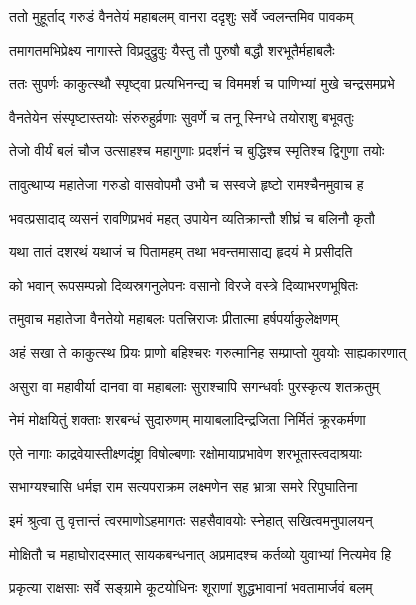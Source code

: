 \twolineshloka
{ततो मुहूर्ताद् गरुडं वैनतेयं महाबलम्}
{वानरा ददृशुः सर्वे ज्वलन्तमिव पावकम्} %

\twolineshloka
{तमागतमभिप्रेक्ष्य नागास्ते विप्रदुद्रुवुः}
{यैस्तु तौ पुरुषौ बद्धौ शरभूतैर्महाबलैः} %

\twolineshloka
{ततः सुपर्णः काकुत्स्थौ स्पृष्ट्वा प्रत्यभिनन्द्य च}
{विममर्श च पाणिभ्यां मुखे चन्द्रसमप्रभे} %

\twolineshloka
{वैनतेयेन संस्पृष्टास्तयोः संरुरुहुर्व्रणाः}
{सुवर्णे च तनू स्निग्धे तयोराशु बभूवतुः} %

\twolineshloka
{तेजो वीर्यं बलं चौज उत्साहश्च महागुणाः}
{प्रदर्शनं च बुद्धिश्च स्मृतिश्च द्विगुणा तयोः} %

\twolineshloka
{तावुत्थाप्य महातेजा गरुडो वासवोपमौ}
{उभौ च सस्वजे हृष्टो रामश्चैनमुवाच ह} %

\twolineshloka
{भवत्प्रसादाद् व्यसनं रावणिप्रभवं महत्}
{उपायेन व्यतिक्रान्तौ शीघ्रं च बलिनौ कृतौ} %

\twolineshloka
{यथा तातं दशरथं यथाजं च पितामहम्}
{तथा भवन्तमासाद्य हृदयं मे प्रसीदति} %

\twolineshloka
{को भवान् रूपसम्पन्नो दिव्यस्रगनुलेपनः}
{वसानो विरजे वस्त्रे दिव्याभरणभूषितः} %

\twolineshloka
{तमुवाच महातेजा वैनतेयो महाबलः}
{पतत्त्रिराजः प्रीतात्मा हर्षपर्याकुलेक्षणम्} %

\twolineshloka
{अहं सखा ते काकुत्स्थ प्रियः प्राणो बहिश्चरः}
{गरुत्मानिह सम्प्राप्तो युवयोः साह्यकारणात्} %

\twolineshloka
{असुरा वा महावीर्या दानवा वा महाबलाः}
{सुराश्चापि सगन्धर्वाः पुरस्कृत्य शतक्रतुम्} %

\twolineshloka
{नेमं मोक्षयितुं शक्ताः शरबन्धं सुदारुणम्}
{मायाबलादिन्द्रजिता निर्मितं क्रूरकर्मणा} %

\twolineshloka
{एते नागाः काद्रवेयास्तीक्ष्णदंष्ट्रा विषोल्बणाः}
{रक्षोमायाप्रभावेण शरभूतास्त्वदाश्रयाः} %

\twolineshloka
{सभाग्यश्चासि धर्मज्ञ राम सत्यपराक्रम}
{लक्ष्मणेन सह भ्रात्रा समरे रिपुघातिना} %

\twolineshloka
{इमं श्रुत्वा तु वृत्तान्तं त्वरमाणोऽहमागतः}
{सहसैवावयोः स्नेहात् सखित्वमनुपालयन्} %

\twolineshloka
{मोक्षितौ च महाघोरादस्मात् सायकबन्धनात्}
{अप्रमादश्च कर्तव्यो युवाभ्यां नित्यमेव हि} %

\twolineshloka
{प्रकृत्या राक्षसाः सर्वे सङ्ग्रामे कूटयोधिनः}
{शूराणां शुद्धभावानां भवतामार्जवं बलम्} %

